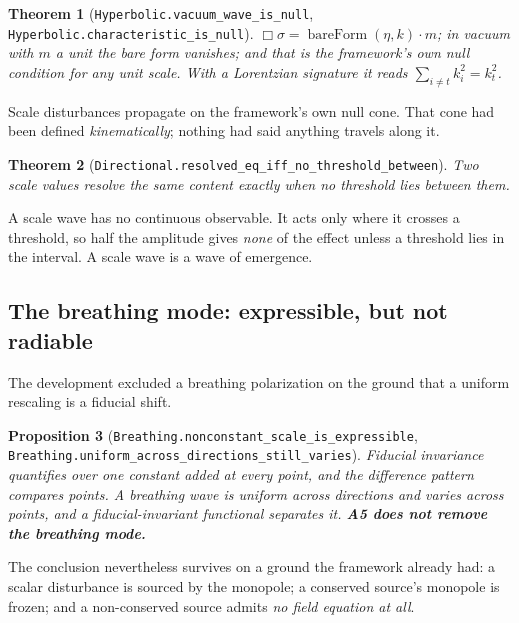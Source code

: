 \documentclass[11pt,a4paper]{article}
\newtheorem{theorem}{Theorem}[section]
\newtheorem{proposition}[theorem]{Proposition}
\theoremstyle{definition}
\theoremstyle{remark}
\newcommand{\lean}[1]{\texttt{\small #1}}
\newcommand{\sg}{\sigma}
\begin{document}
\begin{theorem}[\lean{Hyperbolic.vacuum\_wave\_is\_null},
\lean{Hyperbolic.characteristic\_is\_null}]
$\Box\sg=\operatorname{bareForm}(\eta,k)\cdot m$; in vacuum with $m$ a unit the
bare form vanishes; and that is the framework's own null condition for any unit
scale. With a Lorentzian signature it reads $\sum_{i\neq t}k_i^{2}=k_t^{2}$.
\end{theorem}

\begin{claimbox}
Scale disturbances propagate on the framework's own null cone. That cone had been
defined \emph{kinematically}; nothing had said anything travels along it.
\end{claimbox}

\begin{theorem}[\lean{Directional.resolved\_eq\_iff\_no\_threshold\_between}]
Two scale values resolve the same content exactly when no threshold lies between
them.
\end{theorem}

\begin{claimbox}
A scale wave has no continuous observable. It acts only where it crosses a
threshold, so half the amplitude gives \emph{none} of the effect unless a threshold
lies in the interval. A scale wave is a wave of emergence.
\end{claimbox}

\subsection{The breathing mode: expressible, but not radiable}

The development excluded a breathing polarization on the ground that a uniform
rescaling is a fiducial shift.

\begin{proposition}[\lean{Breathing.nonconstant\_scale\_is\_expressible},
\lean{Breathing.uniform\_across\_directions\_still\_varies}]
Fiducial invariance quantifies over one constant added at \emph{every point}, and
the difference pattern compares \emph{points}. A breathing wave is uniform across
\emph{directions} and varies across \emph{points}, and a fiducial-invariant
functional separates it. \textbf{A5 does not remove the breathing mode.}
\end{proposition}

The conclusion nevertheless survives on a ground the framework already had: a
scalar disturbance is sourced by the monopole; a conserved source's monopole is
frozen; and a non-conserved source admits \emph{no field equation at all}.
\end{document}

